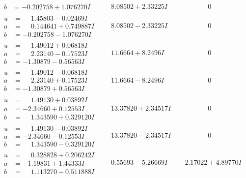 \documentclass[1p]{elsarticle_modified}
\theoremstyle{definition}
\begin{document}
$$\begin{array}{c|c|c}
\begin{aligned}
b &= -0.202758 + 1.076270 I\end{aligned}
 & \phantom{-}8.08502 + 2.33225 I & \phantom{-0.000000 } 0 \\ \hline\begin{aligned}
u &= \phantom{-}1.45803 - 0.02469 I \\
a &= \phantom{-}0.144641 + 0.749887 I \\
b &= -0.202758 - 1.076270 I\end{aligned}
 & \phantom{-}8.08502 - 2.33225 I & \phantom{-0.000000 } 0 \\ \hline\begin{aligned}
u &= \phantom{-}1.49012 + 0.06818 I \\
a &= \phantom{-}2.23140 - 0.17523 I \\
b &= -1.30879 - 0.56563 I\end{aligned}
 & \phantom{-}11.6664 + 8.2496 I & \phantom{-0.000000 } 0 \\ \hline\begin{aligned}
u &= \phantom{-}1.49012 - 0.06818 I \\
a &= \phantom{-}2.23140 + 0.17523 I \\
b &= -1.30879 + 0.56563 I\end{aligned}
 & \phantom{-}11.6664 - 8.2496 I & \phantom{-0.000000 } 0 \\ \hline\begin{aligned}
u &= \phantom{-}1.49130 + 0.03892 I \\
a &= -2.34660 + 0.12553 I \\
b &= \phantom{-}1.343590 + 0.329120 I\end{aligned}
 & \phantom{-}13.37820 + 2.34517 I & \phantom{-0.000000 } 0 \\ \hline\begin{aligned}
u &= \phantom{-}1.49130 - 0.03892 I \\
a &= -2.34660 - 0.12553 I \\
b &= \phantom{-}1.343590 - 0.329120 I\end{aligned}
 & \phantom{-}13.37820 - 2.34517 I & \phantom{-0.000000 } 0 \\ \hline\begin{aligned}
u &= \phantom{-}0.328828 + 0.206242 I \\
a &= -1.19831 + 1.44333 I \\
b &= \phantom{-}1.113270 - 0.511888 I\end{aligned}
 & \phantom{-}0.55693 - 5.26669 I & \phantom{-}2.17022 + 4.89770 I\\

\end{array}$$
\end{document}
